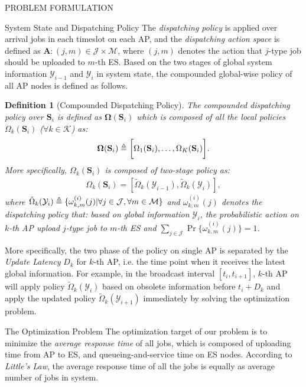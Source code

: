 \documentclass[10pt, conference, letterpaper]{IEEEtran}
\newtheorem{definition}{Definition}
\newcommand{\define}{\triangleq}
\renewcommand{\vec}{\mathbf}
\DeclarePairedDelimiter{\set}{\{}{\}}
\DeclarePairedDelimiter{\Bracket}{\bigg[}{\bigg]}
\newcommand{\apSet}{\mathcal{K}}
\newcommand{\esSet}{\mathcal{M}}
\newcommand{\jSpace}{\mathcal{J}}
\newcommand{\Stat}{\mathbf{S}}
\newcommand{\Obsv}{\mathcal{Y}}
\newcommand{\Policy}{\mathbf{\Omega}}
\begin{document}
\begin{section}{PROBLEM FORMULATION}
\begin{subsection}{System State and Dispatching Policy}
            The \emph{dispatching policy} is applied over arrival jobs in each timeslot on each AP, and the \emph{dispatching action space} is defined as $\mathbf{A}: (j, m) \in \jSpace \times \esSet$, where $(j, m)$ denotes the action that $j$-type job should be uploaded to $m$-th ES.
            Based on the two stages of global system information $\Obsv_{i-1}$ and $\Obsv_{i}$ in system state, the compounded global-wise policy of all AP nodes is defined as follows.
            \begin{definition}[Compounded Dispatching Policy]
                The compounded dispatching policy over $\Stat_{i}$ is defined as $\Policy(\Stat_{i})$ which is composed of all the local policies $\Omega_k(\Stat_{i})$ ($\forall k\in\apSet$) as:
                \begin{align}
                    \vec{\Omega}(\Stat_{i}) \define \Bracket{\Omega_1(\Stat_{i}), \dots, \Omega_K(\Stat_{i})}.
                \end{align}
                More specifically, $\Omega_k(\Stat_{i})$ is composed of two-stage policy as:
                \begin{align}
                    \Omega_k(\Stat_i) = [\tilde{\Omega}_k(\Obsv_{i-1}), \tilde{\Omega}_k(\Obsv_{i})],
                \end{align}
                where $\tilde{\Omega}_k(\Obsv_{i}) \define \set{\omega^{(i)}_{k,m}(j)|\forall j\in\jSpace, \forall m\in\esSet}$ and $\omega^{(i)}_{k,m}(j)$ denotes the dispatching policy that: based on global information $\Obsv_{i}$, the probabilistic action on $k$-th AP upload $j$-type job to $m$-th ES and $\sum_{j\in\jSpace} \Pr\{\omega^{(i)}_{k,m}(j)\}=1$.
            \end{definition}
            More specifically, the two phase of the policy on single AP is separated by the \emph{Update Latency} $D_k$ for $k$-th AP, i.e. the time point when it receives the latest global information. For example, in the broadcast interval $[t_{i}, t_{i+1}]$, $k$-th AP will apply policy $\tilde{\Omega}_k(\Obsv_{i})$ based on obsolete information before $t_i+D_k$ and apply the updated policy $\tilde{\Omega}_k(\Obsv_{i+1})$ immediately by solving the optimization problem.
        \end{subsection}

        \begin{subsection}{The Optimization Problem}
            The optimization target of our problem is to minimize the \emph{average response time} of all jobs, which is composed of uploading time from AP to ES, and queueing-and-service time on ES nodes. According to \emph{Little's Law}, the average response time of all the jobs is equally as average number of jobs in system.


\end{subsection}
\end{section}
\end{document}
